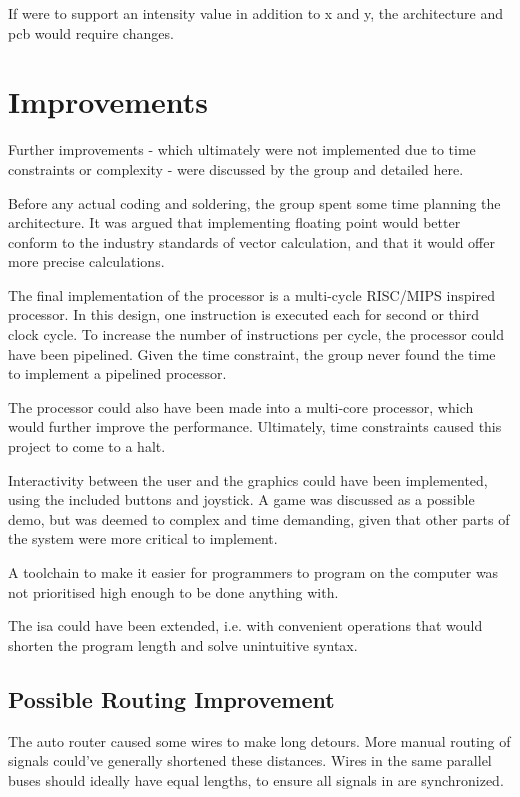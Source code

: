 If \vthreek were to support an intensity value in addition to x and y, the architecture and \gls{pcb} would require changes.

\section{Improvements}
Further improvements - which ultimately were not implemented due to time constraints or complexity - were discussed by the group and detailed here.

Before any actual coding and soldering, the group spent some time planning the architecture. It was argued that implementing floating point would better conform to the industry standards of vector calculation, and that it would offer more precise calculations.

The final implementation of the processor is a multi-cycle RISC/MIPS inspired processor.
In this design, one instruction is executed each for second or third clock cycle.
To increase the number of instructions per cycle, the processor could have been pipelined.
Given the time constraint, the group never found the time to implement a pipelined processor.

The processor could also have been made into a multi-core processor, which would further improve the performance. Ultimately, time constraints caused this project to come to a halt.

Interactivity between the user and the graphics could have been implemented, using the included buttons and joystick. A game was discussed as a possible demo, but was deemed to complex and time demanding, given that other parts of the system were more critical to implement.

A toolchain to make it easier for programmers to program on the computer was not prioritised high enough to be done anything with.

The \gls{isa} could have been extended, i.e. with convenient operations that would shorten the program length and solve unintuitive syntax.

\subsection{Possible Routing Improvement}
The auto router caused some wires to make long detours. 
More manual routing of signals could've generally shortened these distances. 
Wires in the same parallel buses should ideally have equal lengths, to ensure all signals in are synchronized. 
